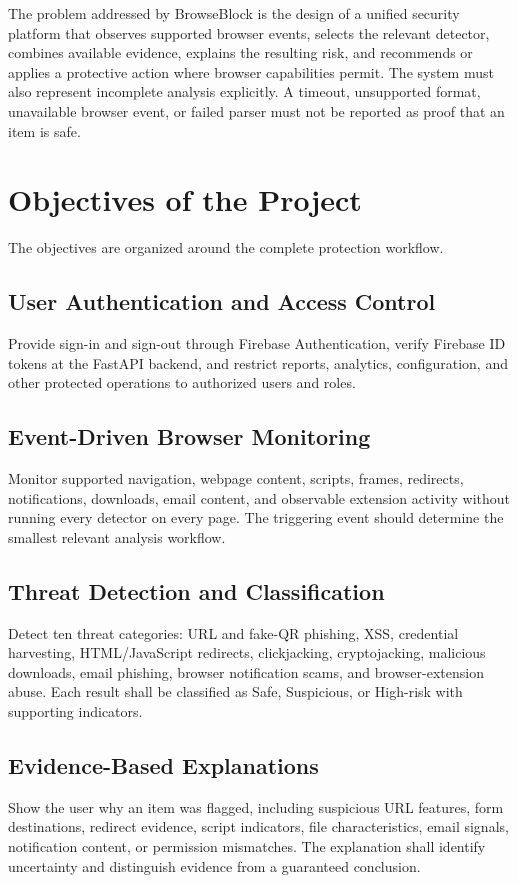 The problem addressed by BrowseBlock is the design of a unified security platform
that observes supported browser events, selects the relevant detector, combines
available evidence, explains the resulting risk, and recommends or applies a
protective action where browser capabilities permit. The system must also represent
incomplete analysis explicitly. A timeout, unsupported format, unavailable browser
event, or failed parser must not be reported as proof that an item is safe.

\section{Objectives of the Project}
The objectives are organized around the complete protection workflow.

\subsection{User Authentication and Access Control}
Provide sign-in and sign-out through Firebase Authentication, verify Firebase ID
tokens at the FastAPI backend, and restrict reports, analytics, configuration, and
other protected operations to authorized users and roles.

\subsection{Event-Driven Browser Monitoring}
Monitor supported navigation, webpage content, scripts, frames, redirects,
notifications, downloads, email content, and observable extension activity without
running every detector on every page. The triggering event should determine the
smallest relevant analysis workflow.

\subsection{Threat Detection and Classification}
Detect ten threat categories: URL and fake-QR phishing, XSS, credential harvesting,
HTML/JavaScript redirects, clickjacking, cryptojacking, malicious downloads, email
phishing, browser notification scams, and browser-extension abuse. Each result shall
be classified as Safe, Suspicious, or High-risk with supporting indicators.

\subsection{Evidence-Based Explanations}
Show the user why an item was flagged, including suspicious URL features, form
destinations, redirect evidence, script indicators, file characteristics, email
signals, notification content, or permission mismatches. The explanation shall
identify uncertainty and distinguish evidence from a guaranteed conclusion.

